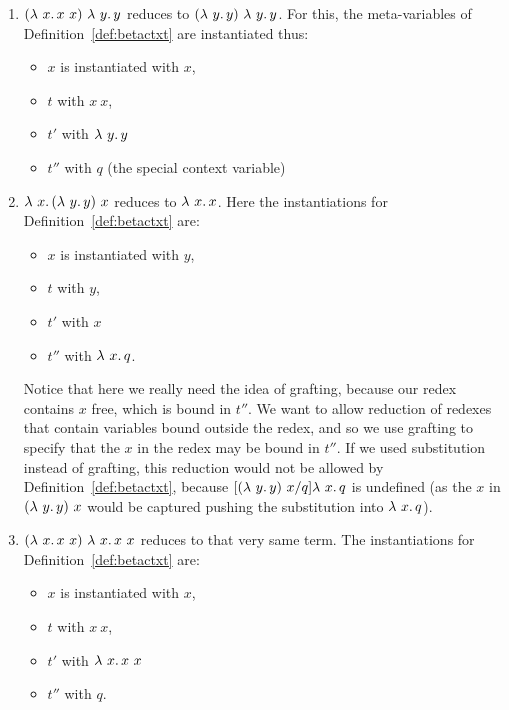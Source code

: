 \begin{enumerate}
  \item $(\lambda\ x.\, x\ x)\ \lambda\ y.\, y$ reduces to
    $(\lambda\ y.\, y)\ \lambda\ y.\, y$.  For this, the meta-variables of
    Definition~\ref{def:betactxt} are instantiated thus:
    \begin{itemize}
    \item $x$ is instantiated with $x$,
    \item $t$ with $x\ x$,
    \item $t'$ with $\lambda\ y.\, y$
    \item $t''$ with $q$ (the special context variable)
    \end{itemize}

\item $\lambda\ x.\, (\lambda\ y.\, y)\ x$ reduces to $\lambda\ x.\, x$.  Here the instantiations for Definition~\ref{def:betactxt} are:
    \begin{itemize}
    \item $x$ is instantiated with $y$,
    \item $t$ with $y$,
    \item $t'$ with $x$
    \item $t''$ with $\lambda\ x.\, q$.
    \end{itemize}

    Notice that here we really need the idea of grafting, because our
    redex contains $x$ free, which is bound in $t''$.  We want to
    allow reduction of redexes that contain variables bound outside
    the redex, and so we use grafting to specify that the $x$ in the
    redex may be bound in $t''$.  If we used substitution instead of
    grafting, this reduction would not be allowed by
    Definition~\ref{def:betactxt}, because $[(\lambda\ y.\, y)\ x/q]\lambda\ x.\, q$
    is undefined (as the $x$ in $(\lambda\ y.\, y)\ x$ would be captured
    pushing the substitution into $\lambda\ x.\, q$).

  \item $(\lambda\ x.\, x\ x)\ \lambda\ x.\, x\ x$ reduces to that very same term.  The instantiations for Definition~\ref{def:betactxt} are:
    
    \begin{itemize}
    \item $x$ is instantiated with $x$,
    \item $t$ with $x\ x$,
    \item $t'$ with $\lambda\ x.\, x\ x$
    \item $t''$ with $q$.
    \end{itemize}


\end{enumerate}
